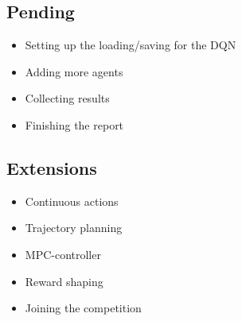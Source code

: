 \documentclass{article}
\begin{document}
\subsection{Pending}

\begin{itemize}
	\item Setting up the loading/saving for the DQN
	\item Adding more agents
	\item Collecting results
	\item Finishing the report
\end{itemize}

\subsection{Extensions}

\begin{itemize}
	\item Continuous actions
	\item Trajectory planning
	\item MPC-controller
	\item Reward shaping
	\item Joining the competition
	
\end{itemize}
\end{document}
